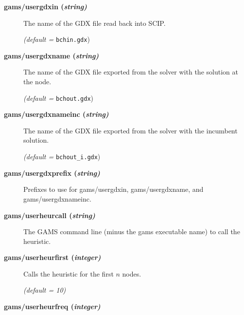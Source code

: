 \begin{description}
\item[\label{scipusergdxin}\hypertarget{scipusergdxin}
{\textbf{gams/usergdxin (\slshape{string})}}]\hspace{1.0in}

The name of the GDX file read back into SCIP.

\textsl{(default =} \verb=bchin.gdx=)

\item[\label{scipusergdxname}\hypertarget{scipusergdxname}
{\textbf{gams/usergdxname (\slshape{string})}}]\hspace{1.0in}

The name of the GDX file exported from the solver with the solution at the node.

\textsl{(default =} \verb=bchout.gdx=)

\item[\label{scipusergdxnameinc}\hypertarget{scipusergdxnameinc}
{\textbf{gams/usergdxnameinc (\slshape{string})}}]\hspace{1.0in}

The name of the GDX file exported from the solver with the incumbent solution.

\textsl{(default =} \verb=bchout_i.gdx=)

\item[\label{scipusergdxprefix}\hypertarget{scipusergdxprefix}
{\textbf{gams/usergdxprefix (\slshape{string})}}]\hspace{1.0in}

Prefixes to use for gams/usergdxin, gams/usergdxname, and gams/usergdxnameinc.


\item[\label{scipuserheurcall}\hypertarget{scipuserheurcall}
{\textbf{gams/userheurcall (\slshape{string})}}]\hspace{1.0in}

The GAMS command line (minus the gams executable name) to call the heuristic.


\item[\label{scipuserheurfirst}\hypertarget{scipuserheurfirst}
{\textbf{gams/userheurfirst (\slshape{integer})}}]\hspace{1.0in}

Calls the heuristic for the first $n$ nodes.

\textsl{(default = 10)}

\item[\label{scipuserheurfreq}\hypertarget{scipuserheurfreq}
{\textbf{gams/userheurfreq (\slshape{integer})}}]\hspace{1.0in}


\end{description}
